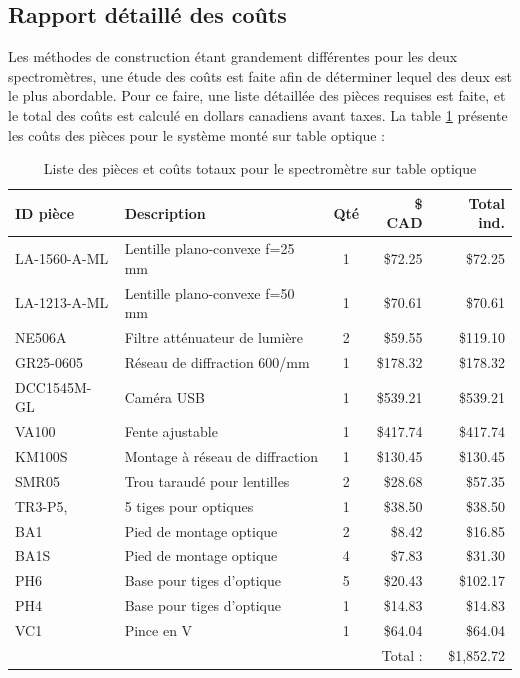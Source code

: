 \documentclass[11pt,letterpaper]{article}
\begin{document}
\subsection{Rapport détaillé des coûts}

Les méthodes de construction étant grandement différentes pour les deux spectromètres, une 
étude des coûts est faite afin de déterminer lequel des deux est le plus abordable. Pour ce
faire, une liste détaillée des pièces requises est faite, et le total des coûts est calculé en
dollars canadiens avant taxes. La table \ref{prix_table} présente les coûts des pièces pour
le système monté sur table optique :

\begin{table}[!ht]
    \centering
    \caption{Liste des pièces et coûts totaux pour le spectromètre sur table optique}
    \begin{tabular}{|l|l|c|r|r|}
    \hline
        ID pièce & Description & Qté & \$ CAD & Total ind. \\ \hline\hline
        LA-1560-A-ML & Lentille plano-convexe f=25 mm & 1 & \$72.25 & \$72.25 \\ \hline
        LA-1213-A-ML & Lentille plano-convexe f=50 mm & 1 & \$70.61 & \$70.61 \\ \hline
        NE506A & Filtre atténuateur de lumière & 2 & \$59.55 & \$119.10 \\ \hline
        GR25-0605 & Réseau de diffraction 600/mm & 1 & \$178.32 & \$178.32 \\ \hline
        DCC1545M-GL & Caméra USB & 1 & \$539.21 & \$539.21 \\ \hline
        VA100 & Fente ajustable & 1 & \$417.74 & \$417.74 \\ \hline
        KM100S & Montage à réseau de diffraction & 1 & \$130.45 & \$130.45 \\ \hline
        SMR05 & Trou taraudé pour lentilles & 2 & \$28.68 & \$57.35 \\ \hline
        TR3-P5, & 5 tiges pour optiques & 1 & \$38.50 & \$38.50 \\ \hline
        BA1 & Pied de montage optique & 2 & \$8.42 & \$16.85 \\ \hline
        BA1S & Pied de montage optique & 4 & \$7.83 & \$31.30 \\ \hline
        PH6 & Base pour tiges d'optique & 5 & \$20.43 & \$102.17 \\ \hline
        PH4 & Base pour tiges d'optique & 1 & \$14.83 & \$14.83 \\ \hline
        VC1 & Pince en V & 1 & \$64.04 & \$64.04 \\ \hline\hline
        ~ & ~ & ~ & Total : & \$1,852.72 \\ \hline
    \end{tabular}
    \label{prix_table}
\end{table}
\end{document}
